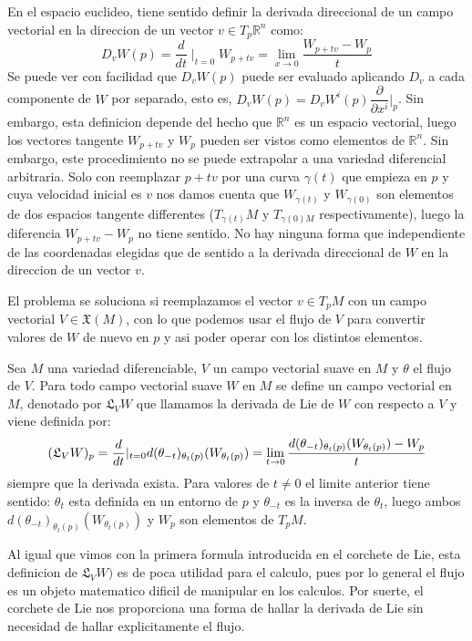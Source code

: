 \documentclass[12pt]{extarticle}
\newcommand{\R}{\mathbb{R}}
\newcommand{\<}{\langle}
\renewcommand{\>}{\rangle}
\theoremstyle{definition}
\begin{document}
En el espacio euclideo, tiene sentido definir la derivada direccional de un
campo vectorial en la direccion de un vector $v \in T_p\R^n$ como:
\begin{equation*}
	D_vW(p) = \dfrac{d}{dt} \mid _{t=0} W_{p + tv} = \lim_{x\to0} \dfrac{W_{p+tv} - W_p}{t}
\end{equation*}
Se puede ver con facilidad que $D_vW(p)$ puede ser evaluado aplicando $D_v$ a
cada componente de $W$ por separado, esto es, $D_vW(p) = D_vW^i(p)
\dfrac{\partial}{\partial x^i}|_p$. Sin embargo, esta definicion depende del
hecho que $\R^n$ es un espacio vectorial, luego los vectores tangente $W_{p+tv}$
y $W_p$ pueden ser vistos como elementos de $\R^n$. Sin embargo, este
procedimiento no se puede extrapolar a una variedad diferencial arbitraria. Solo
con reemplazar $p + tv$ por una curva $\gamma(t)$ que empieza en $p$ y cuya
velocidad inicial es $v$ nos damos cuenta que $W_{\gamma(t)}$ y $W_{\gamma(0)}$
son elementos de dos espacios tangente differentes ($T_{\gamma(t)}M$ y
$T_{\gamma(0)M}$ respectivamente), luego la diferencia $W_{p+tv} - W_p$ no tiene
sentido. No hay ninguna forma que independiente de las coordenadas elegidas que
de sentido a la derivada direccional de $W$ en la direccion de un vector $v$.

El problema se soluciona si reemplazamos el vector $v \in T_pM$ con un campo
vectorial $V \in \mathfrak{X}(M)$, con lo que podemos usar el flujo de $V$ para
convertir valores de $W$ de nuevo en $p$ y asi poder operar con los distintos
elementos.

Sea $M$ una variedad diferenciable, $V$ un campo vectorial suave en $M$ y
$\theta$ el flujo de $V$. Para todo campo vectorial suave $W$ en $M$ se define
un campo vectorial en $M$, denotado por $\mathfrak{L}_VW$ que llamamos la
derivada de Lie de $W$ con respecto a $V$ y viene definida por:
\begin{equation*}
	(\mathfrak{L}_VW)_p = \dfrac{d}{dt}|_{t=0} d(\theta_{-t})_{\theta_{t}(p)}(W_{\theta_t(p)}) \\
	= \lim_{t\to0}\dfrac{d(\theta_{-t})_{\theta_{t}(p)}(W_{\theta_t(p)}) - W_p}{t}
\end{equation*}
siempre que la derivada exista. Para valores de $t \neq 0$ el limite anterior
tiene sentido: $\theta_t$ esta definida en un entorno de $p$ y $\theta_{-t}$ es
la inversa de $\theta_t$, luego ambos
$d(\theta_{-t})_{\theta_{t}(p)}(W_{\theta_t(p)})$ y $W_p$ son elementos de $T_pM$.

Al igual que vimos con la primera formula introducida en el corchete de Lie,
esta definicion de $\mathfrak{L}_VW)$ es de poca utilidad para el calculo, pues
por lo general el flujo es un objeto matematico dificil de manipular en los
calculos. Por suerte, el corchete de Lie nos proporciona una forma de hallar la
derivada de Lie sin necesidad de hallar explicitamente el flujo.
\end{document}
